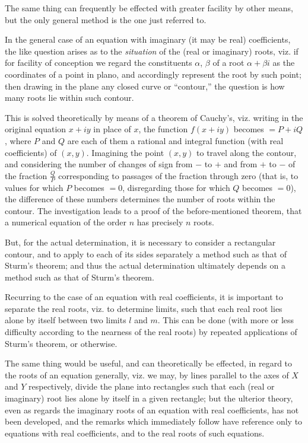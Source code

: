 \documentclass[11pt,a4paper]{book}
\begin{document}
The same thing can frequently be effected with greater facility by other means, but the only general method is the one just referred to.

In the general case of an equation with imaginary (it may be real) coefficients, the like question arises as to the \textit{situation} of the (real or imaginary) roots, viz. if for facility of conception we regard the constituents $\alpha$, $\beta$ of a root $\alpha + \beta i$ as the coordinates of a point in plano, and accordingly represent the root by such point; then drawing in the plane any closed curve or ``contour,'' the question is how many roots lie within such contour.

This is solved theoretically by means of a theorem of Cauchy's, viz. writing in the original equation $x + iy$ in place of $x$, the function $f(x+iy)$ becomes $= P + iQ$, where $P$ and $Q$ are each of them a rational and integral function (with real coefficients) of $(x, y)$. Imagining the point $(x, y)$ to travel along the contour, and considering the number of changes of sign from $-$ to $+$ and from $+$ to $-$ of the fraction $\frac{Q}{P}$ corresponding to passages of the fraction through zero (that is, to values for which $P$ becomes $=0$, disregarding those for which $Q$ becomes $=0$), the difference of these numbers determines the number of roots within the contour. The investigation leads to a proof of the before-mentioned theorem, that a numerical equation of the order $n$ has precisely $n$ roots.

But, for the actual determination, it is necessary to consider a rectangular contour, and to apply to each of its sides separately a method such as that of Sturm's theorem; and thus the actual determination ultimately depends on a method such as that of Sturm's theorem.

Recurring to the case of an equation with real coefficients, it is important to separate the real roots, viz. to determine limits, such that each real root lies alone by itself between two limits $l$ and $m$. This can be done (with more or less difficulty according to the nearness of the real roots) by repeated applications of Sturm's theorem, or otherwise.

The same thing would be useful, and can theoretically be effected, in regard to the roots of an equation generally, viz. we may, by lines parallel to the axes of $X$ and $Y$ respectively, divide the plane into rectangles such that each (real or imaginary) root lies alone by itself in a given rectangle; but the ulterior theory, even as regards the imaginary roots of an equation with real coefficients, has not been developed, and the remarks which immediately follow have reference only to equations with real coefficients, and to the real roots of such equations.
\end{document}
